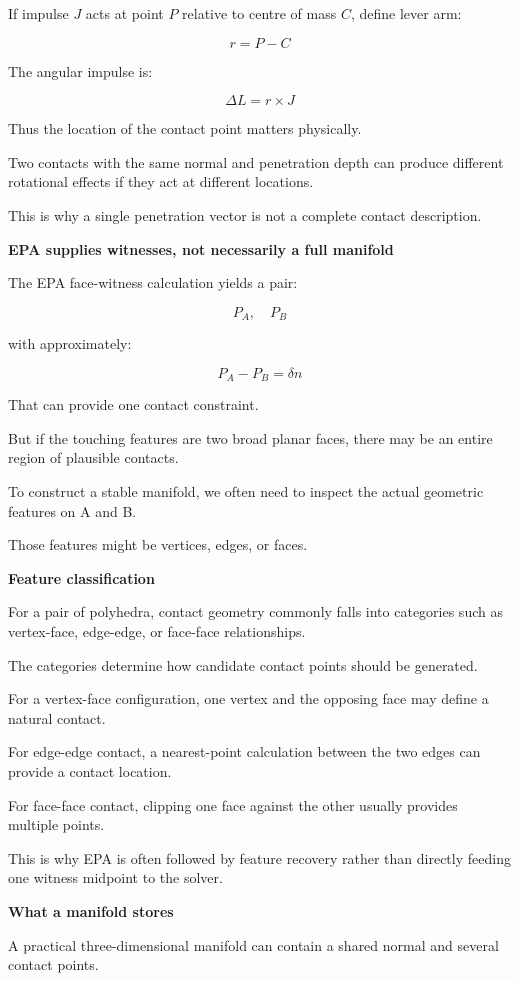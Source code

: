 If impulse \(J\) acts at point \(P\) relative to centre of mass \(C\), define lever arm:

\[
r=P-C
\]

The angular impulse is:

\[
\boxed{ \Delta L=r\times J }
\]

Thus the location of the contact point matters physically.

Two contacts with the same normal and penetration depth can produce different rotational effects if they act at different locations.

This is why a single penetration vector is not a complete contact description.

\textbf{EPA supplies witnesses, not necessarily a full manifold}

The EPA face-witness calculation yields a pair:

\[
P_A,\quad P_B
\]

with approximately:

\[
P_A-P_B=\delta n
\]

That can provide one contact constraint.

But if the touching features are two broad planar faces, there may be an entire region of plausible contacts.

To construct a stable manifold, we often need to inspect the actual geometric features on A and B.

Those features might be vertices, edges, or faces.

\textbf{Feature classification}

For a pair of polyhedra, contact geometry commonly falls into categories such as vertex-face, edge-edge, or face-face relationships.

The categories determine how candidate contact points should be generated.

For a vertex-face configuration, one vertex and the opposing face may define a natural contact.

For edge-edge contact, a nearest-point calculation between the two edges can provide a contact location.

For face-face contact, clipping one face against the other usually provides multiple points.

This is why EPA is often followed by feature recovery rather than directly feeding one witness midpoint to the solver.

\textbf{What a manifold stores}

A practical three-dimensional manifold can contain a shared normal and several contact points.

